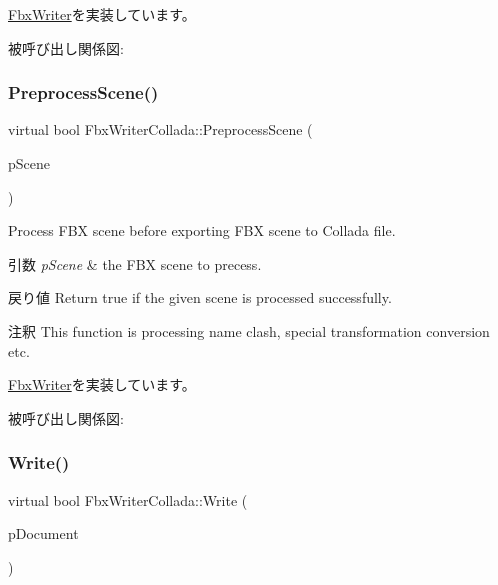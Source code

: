\hyperlink{class_fbx_writer_a1cfdf59f72ebe777484862e4b64b5d65}{Fbx\+Writer}を実装しています。

被呼び出し関係図\+:
\mbox{\label{class_fbx_writer_collada_aee5b9934adfdd982e0c33373ddf77121}} 
\subsubsection{\texorpdfstring{Preprocess\+Scene()}{PreprocessScene()}}
{\footnotesize\ttfamily virtual bool Fbx\+Writer\+Collada\+::\+Preprocess\+Scene (\begin{DoxyParamCaption}\item[{\hyperlink{class_fbx_scene}{Fbx\+Scene} \&}]{p\+Scene }\end{DoxyParamCaption})\hspace{0.3cm}{\ttfamily [virtual]}}

Process F\+BX scene before exporting F\+BX scene to Collada file. 
\begin{DoxyParams}{引数}
{\em p\+Scene} & the F\+BX scene to precess. \\
\hline
\end{DoxyParams}
\begin{DoxyReturn}{戻り値}
Return true if the given scene is processed successfully. 
\end{DoxyReturn}
\begin{DoxyRemark}{注釈}
This function is processing name clash, special transformation conversion etc. 
\end{DoxyRemark}


\hyperlink{class_fbx_writer_a0fd62ec785e7108924975591ee8fbf30}{Fbx\+Writer}を実装しています。

被呼び出し関係図\+:
\mbox{\label{class_fbx_writer_collada_aaf5a632f5fa72c521d578ad17ae0aea1}} 
\subsubsection{\texorpdfstring{Write()}{Write()}}
{\footnotesize\ttfamily virtual bool Fbx\+Writer\+Collada\+::\+Write (\begin{DoxyParamCaption}\item[{\hyperlink{class_fbx_document}{Fbx\+Document} $\ast$}]{p\+Document }\end{DoxyParamCaption})\hspace{0.3cm}{\ttfamily [virtual]}}

